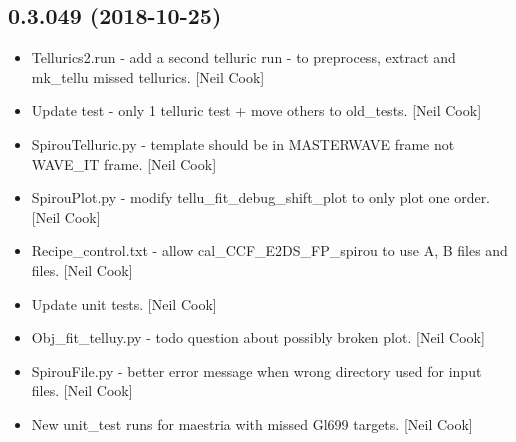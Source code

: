 \documentclass[a4paper,10pt,english]{report}
\begin{document}
\subsection{0.3.049 (2018-10-25)}
\label{\detokenize{misc/changelog:id281}}\begin{itemize}
\item {} 
Tellurics2.run - add a second telluric run - to preprocess, extract
and mk\_tellu missed tellurics. {[}Neil Cook{]}

\item {} 
Update test - only 1 telluric test + move others to old\_tests. {[}Neil
Cook{]}

\item {} 
SpirouTelluric.py - template should be in MASTERWAVE frame not WAVE\_IT
frame. {[}Neil Cook{]}

\item {} 
SpirouPlot.py - modify tellu\_fit\_debug\_shift\_plot to only plot one
order. {[}Neil Cook{]}

\item {} 
Recipe\_control.txt - allow cal\_CCF\_E2DS\_FP\_spirou to use A, B files
and  files. {[}Neil Cook{]}

\item {} 
Update unit tests. {[}Neil Cook{]}

\item {} 
Obj\_fit\_telluy.py - todo question about possibly broken plot. {[}Neil
Cook{]}

\item {} 
SpirouFile.py - better error message when wrong directory used for
input files. {[}Neil Cook{]}

\item {} 
New unit\_test runs for maestria with missed Gl699 targets. {[}Neil Cook{]}

\end{itemize}
\end{document}
